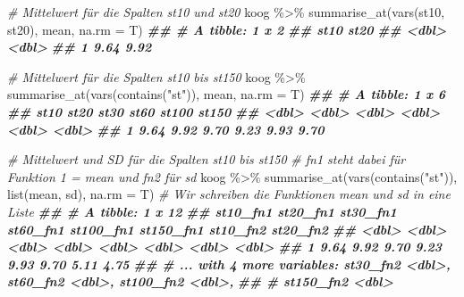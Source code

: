 \documentclass[
]{article}
\newenvironment{Shaded}{\begin{snugshade}}{\end{snugshade}}
\newcommand{\AttributeTok}[1]{\textcolor[rgb]{0.77,0.63,0.00}{#1}}
\newcommand{\CommentTok}[1]{\textcolor[rgb]{0.56,0.35,0.01}{\textit{#1}}}
\newcommand{\DocumentationTok}[1]{\textcolor[rgb]{0.56,0.35,0.01}{\textbf{\textit{#1}}}}
\newcommand{\FunctionTok}[1]{\textcolor[rgb]{0.00,0.00,0.00}{#1}}
\newcommand{\NormalTok}[1]{#1}
\newcommand{\SpecialCharTok}[1]{\textcolor[rgb]{0.00,0.00,0.00}{#1}}
\newcommand{\StringTok}[1]{\textcolor[rgb]{0.31,0.60,0.02}{#1}}
\begin{document}
\begin{Shaded}
\begin{Highlighting}[]
\CommentTok{\# Mittelwert für die Spalten st10 und st20}
\NormalTok{koog }\SpecialCharTok{\%\textgreater{}\%}
  \FunctionTok{summarise\_at}\NormalTok{(}\FunctionTok{vars}\NormalTok{(st10, st20), mean, }\AttributeTok{na.rm =}\NormalTok{ T) }
\DocumentationTok{\#\# \# A tibble: 1 x 2}
\DocumentationTok{\#\#    st10  st20}
\DocumentationTok{\#\#   \textless{}dbl\textgreater{} \textless{}dbl\textgreater{}}
\DocumentationTok{\#\# 1  9.64  9.92}

\CommentTok{\# Mittelwert für die Spalten st10 bis st150}
\NormalTok{koog }\SpecialCharTok{\%\textgreater{}\%}
  \FunctionTok{summarise\_at}\NormalTok{(}\FunctionTok{vars}\NormalTok{(}\FunctionTok{contains}\NormalTok{(}\StringTok{"st"}\NormalTok{)), mean, }\AttributeTok{na.rm =}\NormalTok{ T)}
\DocumentationTok{\#\# \# A tibble: 1 x 6}
\DocumentationTok{\#\#    st10  st20  st30  st60 st100 st150}
\DocumentationTok{\#\#   \textless{}dbl\textgreater{} \textless{}dbl\textgreater{} \textless{}dbl\textgreater{} \textless{}dbl\textgreater{} \textless{}dbl\textgreater{} \textless{}dbl\textgreater{}}
\DocumentationTok{\#\# 1  9.64  9.92  9.70  9.23  9.93  9.70}

\CommentTok{\# Mittelwert und SD für die Spalten st10 bis st150}
\CommentTok{\# fn1 steht dabei für Funktion 1 = mean und fn2 für sd}
\NormalTok{koog }\SpecialCharTok{\%\textgreater{}\%}
  \FunctionTok{summarise\_at}\NormalTok{(}\FunctionTok{vars}\NormalTok{(}\FunctionTok{contains}\NormalTok{(}\StringTok{"st"}\NormalTok{)), }\FunctionTok{list}\NormalTok{(mean, sd), }\AttributeTok{na.rm =}\NormalTok{ T) }\CommentTok{\# Wir schreiben die Funktionen mean und sd in eine Liste }
\DocumentationTok{\#\# \# A tibble: 1 x 12}
\DocumentationTok{\#\#   st10\_fn1 st20\_fn1 st30\_fn1 st60\_fn1 st100\_fn1 st150\_fn1 st10\_fn2 st20\_fn2}
\DocumentationTok{\#\#      \textless{}dbl\textgreater{}    \textless{}dbl\textgreater{}    \textless{}dbl\textgreater{}    \textless{}dbl\textgreater{}     \textless{}dbl\textgreater{}     \textless{}dbl\textgreater{}    \textless{}dbl\textgreater{}    \textless{}dbl\textgreater{}}
\DocumentationTok{\#\# 1     9.64     9.92     9.70     9.23      9.93      9.70     5.11     4.75}
\DocumentationTok{\#\# \# ... with 4 more variables: st30\_fn2 \textless{}dbl\textgreater{}, st60\_fn2 \textless{}dbl\textgreater{}, st100\_fn2 \textless{}dbl\textgreater{},}
\DocumentationTok{\#\# \#   st150\_fn2 \textless{}dbl\textgreater{}}


\end{Highlighting}
\end{Shaded}
\end{document}
